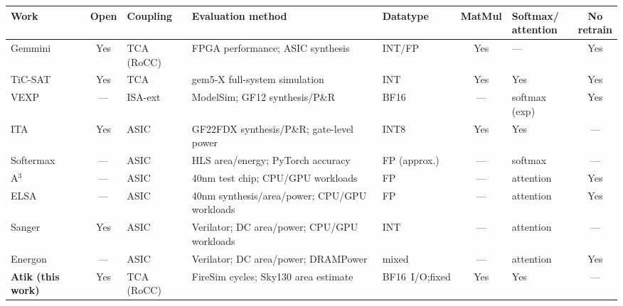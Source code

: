 \documentclass[sigconf,nonacm]{acmart}
\newcommand{\cmark}{Yes}
\begin{document}
\begin{strip}
\begin{minipage}{\textwidth}
  \label{tab:positioning}
  \small
  \setlength{\tabcolsep}{4pt}
  \renewcommand{\arraystretch}{1.2}
  \begin{tabularx}{\textwidth}{@{}lcl>{\raggedright\arraybackslash}X>{\raggedright\arraybackslash}p{1.65cm}c>{\raggedright\arraybackslash}p{1.4cm}c@{}}
    \toprule
    Work & Open & Coupling & Evaluation method & Datatype & MatMul & \shortstack[l]{Softmax/\\attention}
      & \shortstack{No\\retrain} \\
    \midrule
    Gemmini \cite{gemmini}        & \cmark & TCA (RoCC) & FPGA performance; ASIC synthesis
      & INT/FP & \cmark & --- & \cmark \\
    TiC-SAT \cite{ticsat}         & \cmark & TCA        & gem5-X full-system simulation
      & INT & \cmark & \cmark & \cmark \\
    VEXP \cite{vexp}              & --- & ISA-ext    & ModelSim; GF12 synthesis/P\&R & BF16
      & --- & softmax (exp) & \cmark \\
    ITA \cite{ita}                & \cmark & ASIC       & GF22FDX synthesis/P\&R; gate-level power & INT8
      & \cmark & \cmark & --- \\
    Softermax \cite{softermax}    & --- & ASIC       & HLS area/energy; PyTorch accuracy & FP (approx.)
      & --- & softmax & --- \\
    A$^3$ \cite{a3}               & --- & ASIC       & 40nm test chip; CPU/GPU workloads & FP
      & --- & attention & \cmark \\
    ELSA \cite{elsa}              & --- & ASIC       & 40nm synthesis/area/power; CPU/GPU workloads & FP
      & --- & attention & \cmark \\
    Sanger \cite{sanger}          & \cmark & ASIC       & Verilator; DC area/power; CPU/GPU workloads & INT
      & --- & attention & --- \\
    Energon \cite{energon}        & --- & ASIC       & Verilator; DC area/power; DRAMPower & mixed
      & --- & attention & \cmark \\
    \textbf{Atik (this work)}     & \cmark & TCA (RoCC) & FireSim cycles; Sky130 area estimate
      & \mbox{BF16 I/O;}\newline fixed & \cmark & \cmark & --- \\
    \bottomrule
  \end{tabularx}
\end{minipage}
\end{strip}
\end{document}
